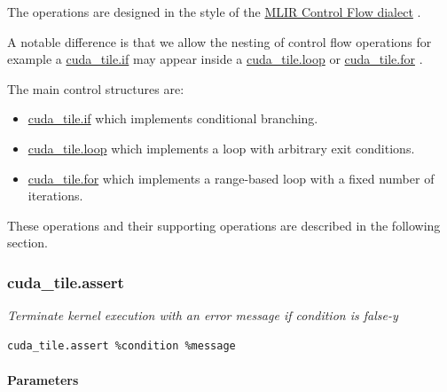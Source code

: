 \documentclass{article}
\begin{document}
The operations are designed in the style of the \href{https://mlir.llvm.org/docs/Dialects/ControlFlow/}{MLIR Control Flow dialect} .


A notable difference is that we allow the nesting of control flow operations for example a \href{https://docs.nvidia.com/cuda/tile-ir/latest/sections/operations.html#op-cuda-tile-if}{cuda\_tile.if} may appear inside a \href{https://docs.nvidia.com/cuda/tile-ir/latest/sections/operations.html#op-cuda-tile-loop}{cuda\_tile.loop} or \href{https://docs.nvidia.com/cuda/tile-ir/latest/sections/operations.html#op-cuda-tile-for}{cuda\_tile.for} .


The main control structures are:


\begin{itemize}
\item \href{https://docs.nvidia.com/cuda/tile-ir/latest/sections/operations.html#op-cuda-tile-if}{cuda\_tile.if} which implements conditional branching.
\item \href{https://docs.nvidia.com/cuda/tile-ir/latest/sections/operations.html#op-cuda-tile-loop}{cuda\_tile.loop} which implements a loop with arbitrary exit conditions.
\item \href{https://docs.nvidia.com/cuda/tile-ir/latest/sections/operations.html#op-cuda-tile-for}{cuda\_tile.for} which implements a range-based loop with a fixed number of iterations.

\end{itemize}
These operations and their supporting operations are described in the following section.


\subsubsection{cuda\_tile.assert}

\textit{Terminate kernel execution with an error message if condition is false-y}


\begin{lstlisting}
cuda_tile.assert %condition %message
\end{lstlisting}

\paragraph{Parameters}
\end{document}
